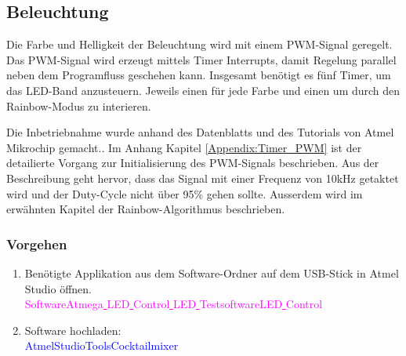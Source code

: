 \subsection{Beleuchtung}
\label{subsec:Inbetriebnahme_Beleuchtung}

Die Farbe und Helligkeit der Beleuchtung wird mit einem PWM-Signal geregelt. Das PWM-Signal wird erzeugt mittels Timer Interrupts, damit Regelung parallel neben dem Programfluss geschehen kann. Insgesamt benötigt es fünf Timer, um das LED-Band anzusteuern. Jeweils einen für jede Farbe und einen um durch den Rainbow-Modus zu interieren.

Die Inbetriebnahme wurde anhand des Datenblatts und des Tutorials von Atmel Mikrochip gemacht.\cite{mikrochip_makes_getting_2015}\cite{mikrochip_makes_getting_2015-1}\cite{mikrochip_makes_getting_2015-2}. Im Anhang Kapitel \ref{Appendix:Timer_PWM} ist der detailierte Vorgang zur Initialisierung des PWM-Signals beschrieben. Aus der Beschreibung geht hervor, dass das Signal mit einer Frequenz von 10kHz getaktet wird und der Duty-Cycle nicht über 95\% gehen sollte. Ausserdem wird im erwähnten Kapitel der Rainbow-Algorithmus beschrieben.



\subsubsection{Vorgehen}

\begin{enumerate}
\item Benötigte Applikation aus dem Software-Ordner auf dem USB-Stick in Atmel Studio öffnen.\\
\textcolor{magenta}{Software\textrightarrow Atmega\underline{ }LED\underline{ }Control\underline{ }LED\underline{ }Testsoftware\textrightarrow LED\underline{ }Control}\\

\item Software hochladen:\\
\textcolor{blue}{AtmelStudio\textrightarrow Tools\textrightarrow Cocktailmixer}\\

\end{enumerate}